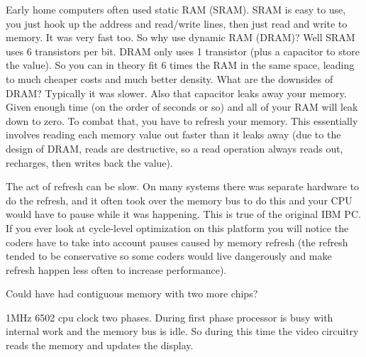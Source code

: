 \documentclass{article}
\begin{document}
Early home computers often used static RAM (SRAM).
SRAM is easy to use, you just hook up the address and read/write lines,
then just read and write to memory.
It was very fast too.
So why use dynamic RAM (DRAM)?
Well SRAM uses 6 transistors per bit.
DRAM only uses 1 transistor (plus a capacitor to store the value).
So you can in theory fit 6 times the RAM in the same space, leading
to much cheaper costs and much better density.
What are the downsides of DRAM?
Typically it was slower.
Also that capacitor leaks away your memory.
Given enough time (on the order of seconds or so) and all of your RAM
will leak down to zero.
To combat that, you have to refresh your memory.
This essentially involves reading each memory value out faster
than it leaks away (due to the design of DRAM, reads are destructive,
so a read operation always reads out, recharges, then writes back
the value).

The act of refresh can be slow.
On many systems there was separate hardware to do the refresh, and
it often took over the memory bus to do this and your CPU would have
to pause while it was happening.
This is true of the original IBM PC.
If you ever look at cycle-level optimization on this platform you will
notice the coders have to take into account pauses caused by
memory refresh (the refresh tended to be conservative so some coders
would live dangerously and make refresh happen less often to increase
performance).


Could have had contiguous memory with two more chips?

1MHz 6502 cpu clock two phases.  During first phase processor is busy
with internal work and the memory bus is idle.  So during this
time the video circuitry reads the memory and updates the display.
\end{document}
